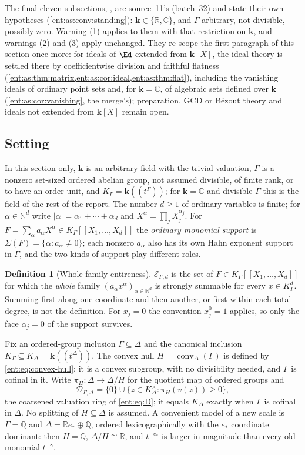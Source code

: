 \documentclass[11pt]{article}
\theoremstyle{plain}
\theoremstyle{plain}
\theoremstyle{plain}
\theoremstyle{definition}
\newtheorem{definition}[definition]{Definition}
\theoremstyle{definition}
\theoremstyle{definition}
\theoremstyle{definition}
\theoremstyle{remark}
\newcommand{\C}{\mathbb C}\newcommand{\R}{\mathbb R}
\newcommand{\Q}{\mathbb Q}\newcommand{\Z}{\mathbb Z}\newcommand{\N}{\mathbb N}
\newcommand{\K}{K_\Gamma}\newcommand{\KD}{K_\Delta}
\newcommand{\Dom}{\mathcal D_{\Gamma,\Delta}}
\DeclareMathOperator{\conv}{conv}
\newcommand{\kk}{\mathbf k}\newcommand{\PP}{\mathbb P}
\begin{document}
The final eleven subsections,
, are source~11's
(batch~32) and state their own hypotheses (\cref{ent:as:conv:standing}):
$\kk\in\{\R,\C\}$, and $\Gamma$ arbitrary, not divisible, possibly zero.
Warning (1) applies to them with that restriction on $\kk$, and warnings (2)
and (3) apply unchanged. They re-scope the first paragraph of this section
once more: for ideals of $\Ed$ extended from $\kk[X]$, the ideal theory is
settled there by coefficientwise division and faithful flatness
(\cref{ent:as:thm:matrix,ent:as:cor:ideal,ent:as:thm:flat}), including the
vanishing ideals of ordinary point sets and, for $\kk=\C$, of algebraic sets
defined over $\kk$ (\cref{ent:as:cor:vanishing}, the merge's); preparation,
GCD or B\'ezout theory and ideals not extended from $\kk[X]$ remain open.

\subsection{Setting}
\label{ent:mv:subsec:setting}
In this section only, $\kk$ is an arbitrary field with the trivial valuation,
$\Gamma$ is a nonzero set-sized ordered abelian group, not assumed divisible,
of finite rank, or to have an order unit, and $\K=\kk((t^\Gamma))$; for
$\kk=\C$ and divisible $\Gamma$ this is the field of the rest of the report.
The number $d\ge1$ of ordinary variables is finite; for $\alpha\in\N^d$ write
$|\alpha|=\alpha_1+\cdots+\alpha_d$ and $X^\alpha=\prod_jX_j^{\alpha_j}$. For
$F=\sum_\alpha a_\alpha X^\alpha\in\K[[X_1,\ldots,X_d]]$ the \emph{ordinary
monomial support} is $\Sigma(F)=\{\alpha:a_\alpha\ne0\}$; each nonzero
$a_\alpha$ also has its own Hahn exponent support in $\Gamma$, and the two
kinds of support play different roles.

\begin{definition}[Whole-family entireness]\label{ent:mv:def:entire}
$\mathcal E_{\Gamma,d}$ is the set of $F\in\K[[X_1,\ldots,X_d]]$ for which the
\emph{whole} family $(a_\alpha x^\alpha)_{\alpha\in\N^d}$ is strongly
summable for every $x\in\K^d$. Summing first along one coordinate and then
another, or first within each total degree, is not the definition. For
$x_j=0$ the convention $x_j^0=1$ applies, so only the face $\alpha_j=0$ of
the support survives.
\end{definition}

Fix an ordered-group inclusion $\Gamma\subseteq\Delta$ and the canonical
inclusion $\K\subseteq\KD=\kk((t^\Delta))$. The convex hull
$H=\conv_\Delta(\Gamma)$ is defined by \eqref{ent:eq:convex-hull}; it is a
convex subgroup, with no divisibility needed, and $\Gamma$ is cofinal in it.
Write $\pi_H:\Delta\to\Delta/H$ for the quotient map of ordered groups and
\[
 \Dom=\{0\}\cup\{z\in\KD^\times:\pi_H(v(z))\ge0\},
\]
the coarsened valuation ring of \eqref{ent:eq:D}; it equals $\KD$ exactly
when $\Gamma$ is cofinal in $\Delta$. No splitting of $H\subseteq\Delta$ is
assumed. A convenient model of a new scale is $\Gamma=\Q$ and
$\Delta=\R e_*\oplus\Q$, ordered lexicographically with the $e_*$ coordinate
dominant: then $H=\Q$, $\Delta/H\cong\R$, and $t^{-e_*}$ is larger in
magnitude than every old monomial $t^{-\gamma}$.
\end{document}

